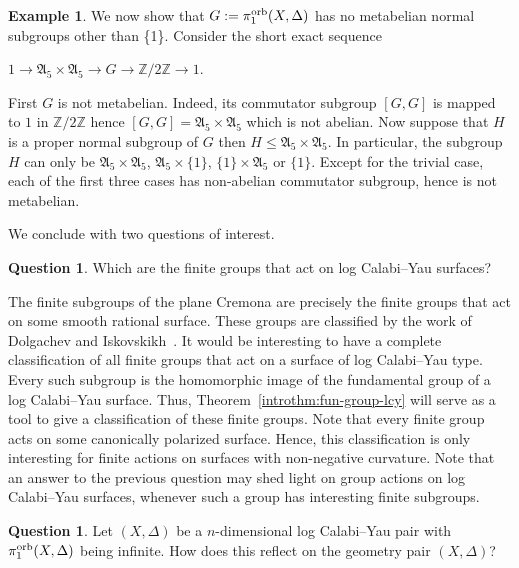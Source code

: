 \documentclass{amsart}
\theoremstyle{definition}
\newtheorem{example}[theorem]{Example}
\newtheorem{question}[theorem]{Question}
\theoremstyle{remark}
\numberwithin{equation}{section}
\begin{document}
\begin{example}
We now show that $G:=\pi_1^{\rm orb}(X,\Delta)$ has no metabelian normal subgroups other than \{1\}. Consider the short exact sequence
\begin{center}
    $1\rightarrow \mathfrak{A}_5\times \mathfrak{A}_5\rightarrow G\rightarrow \mathbb{Z}/2\mathbb{Z}\rightarrow 1$.
\end{center}
First $G$ is not metabelian. Indeed, its commutator subgroup $[G,G]$ is mapped to $1$ in $\mathbb{Z}/2\mathbb{Z}$ hence $[G,G]=\mathfrak{A}_5\times \mathfrak{A}_5$ which is not abelian. Now suppose that $H$ is a proper normal subgroup of $G$ then $H\leqslant \mathfrak{A}_5\times \mathfrak{A}_5$. In particular, the subgroup $H$ can only be $\mathfrak{A}_5\times \mathfrak{A}_5$, $\mathfrak{A}_5\times \{1\}$, $\{1\}\times \mathfrak{A}_5$ or $\{1\}$. Except for the trivial case, each of the first three cases has non-abelian commutator subgroup, hence is not metabelian.
\end{example}

We conclude with two questions of interest.

\begin{question}
Which are the finite groups that act on log Calabi--Yau surfaces?
\end{question}

The finite subgroups of the plane Cremona are precisely the finite groups that act on some smooth rational surface.
These groups are classified
by the work of Dolgachev and Iskovskikh~\cite{DI09}.
It would be interesting to have a complete classification of all 
finite groups that act on a surface of log Calabi--Yau type.
Every such subgroup is the homomorphic image of the fundamental group of a log Calabi--Yau surface.
Thus, Theorem~\ref{introthm:fun-group-lcy} will serve as a tool to give a classification of these finite groups.
Note that every finite group acts on some canonically polarized surface. Hence, this classification is only interesting for finite actions on surfaces with non-negative curvature.
Note that an answer to the previous question may shed light on group actions on log Calabi--Yau surfaces, whenever such a group has interesting finite subgroups.

\begin{question}\label{quest:infinite}
Let $(X,\Delta)$ be a $n$-dimensional log Calabi--Yau pair with $\pi_1^{\rm orb}(X,\Delta)$ being infinite. How does this reflect on the geometry pair $(X,\Delta)$? 
\end{question}
\end{document}

